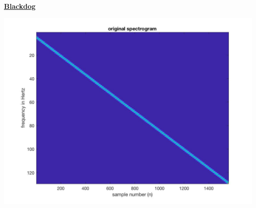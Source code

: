 \documentclass{article}
\begin{document}
  \color{red}
  \underline{\textbf{Blackdog}}
  \color{black}

\includegraphics[scale=.5]{Blackdog1}
\end{document}
